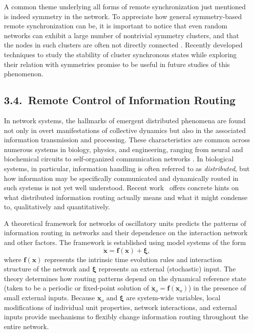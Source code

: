 \documentclass[
preprint,
superscriptaddress,
aps,
prl,
]{revtex4-1}
\begin{document}
A common theme underlying all forms of remote synchronization just mentioned is indeed symmetry in the network. To appreciate how general symmetry-based remote synchronization can be, it is important to notice that even random networks can exhibit a large number of nontrivial symmetry clusters, and that the nodes in such clusters are often not directly connected \cite{macarthur2008symmetry}.  Recently developed techniques \cite{pecora2013symmetries} to study the stability of cluster synchronous states while exploring their relation with symmetries promise to be useful in future studies of this phenomenon.


\subsection{3.4.~Remote Control of Information Routing}

In network systems,
the hallmarks of emergent distributed phenomena are found
not only  in overt manifestations of
collective dynamics  but also  in the associated
information transmission and processing.
These characteristics are common
 across numerous
systems in biology, physics, and engineering, 
 ranging from neural and biochemical circuits to 
self-organized communication networks 
 \cite{Hopfield1982, Cardelli2017, Klinglmayr2012applied, Klinglmayr2012theory}.
In biological systems, in particular,
 information handling 
 is often referred to as  {\it distributed}, but
 how information may be specifically communicated and dynamically routed in such systems is not yet well understood.
Recent 
{\color{black} work~\cite{Kirst2012}}
offers concrete hints on what  distributed
 information routing actually means and what it might 
 condense 
   {\color{black} to,}
 qualitatively and quantitatively. 

A theoretical framework for networks of oscillatory units \cite{Kirst2016}
predicts the patterns of information routing in networks 
 and 
   {\color{black} their}
 dependence on
the interaction network
and other factors.  
The framework is established using model systems of the form
\begin{equation}
\dot{\boldsymbol x}= {\boldsymbol f}({\boldsymbol x}) + {\boldsymbol \xi},
\end{equation}
where ${\boldsymbol f}({\boldsymbol x})$ represents the 
intrinsic time evolution rules and interaction structure of the network and ${\boldsymbol \xi}$ represents an 
external (stochastic) input.
The theory determines
how routing patterns depend on the dynamical reference state
  {\color{black} (taken}
  to be a 
  {\color{black}  periodic or fixed-point}
  solution 
of $\dot{\boldsymbol x}_o= {\boldsymbol f}({\boldsymbol x}_o)$) in the presence of small external inputs. 
Because  ${\boldsymbol x}_o$ and ${\boldsymbol \xi}$ are system-wide variables,
local modifications of individual unit properties,   
network interactions, and  external inputs provide mechanisms to flexibly change information routing throughout the entire network. 
\end{document}
